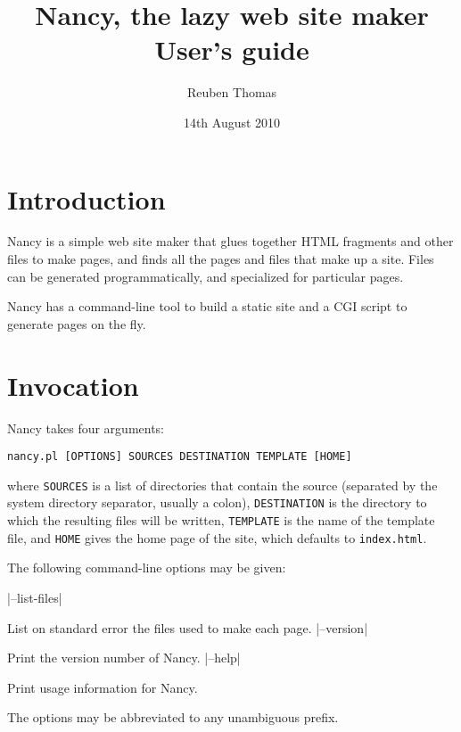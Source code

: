 \documentclass[english]{scrartcl}
\begin{document}
\title{Nancy, the lazy web site maker\\User’s guide}
\date{14th August 2010}
\author{Reuben Thomas}
\maketitle

\section{Introduction}

Nancy is a simple web site maker that glues together HTML fragments and other files to make pages, and finds all the pages and files that make up a site. Files can be generated programmatically, and specialized for particular pages.

Nancy has a command-line tool to build a static site and a CGI script to generate pages on the fly.

\section{Invocation}

Nancy takes four arguments:

\begin{verbatim}
nancy.pl [OPTIONS] SOURCES DESTINATION TEMPLATE [HOME]
\end{verbatim}

\noindent where \verb|SOURCES| is a list of directories that contain the source (separated by the system directory separator, usually a colon), \verb|DESTINATION| is the directory to which the resulting files will be written, \verb|TEMPLATE| is the name of the template file, and \verb|HOME| gives the home page of the site, which defaults to \verb|index.html|.

The following command-line options may be given:

\begin{description}
|--list-files|
\item[\UseVerb{listfiles}]List on standard error the files used to make each page.
|--version|
\item[\UseVerb{version}]Print the version number of Nancy.
|--help|
\item[\UseVerb{help}]Print usage information for Nancy.
\end{description}

The options may be abbreviated to any unambiguous prefix.
\end{document}
